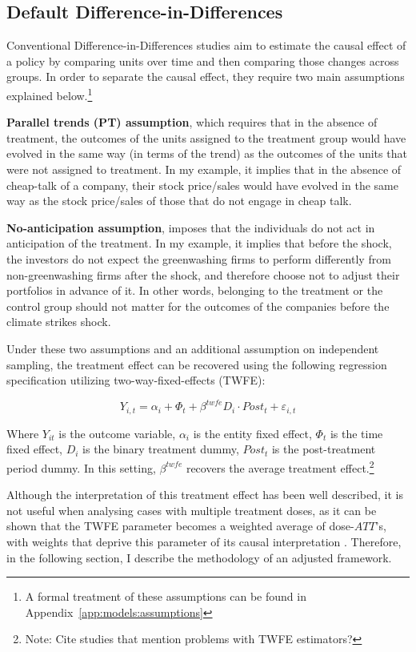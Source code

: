\documentclass[12pt]{article}
\begin{document}
\subsection{Default Difference-in-Differences}

Conventional Difference-in-Differences studies aim to estimate the causal effect of a policy by comparing units over time and then comparing those changes across groups. In order to separate the causal effect, they require two main assumptions explained below.\footnote{A formal treatment of these assumptions can be found in Appendix~\ref{app:models:assumptions}} 

\textbf{Parallel trends (PT) assumption}, which requires that in the absence of treatment, the outcomes of the units assigned to the treatment group would have evolved in the same way (in terms of the trend) as the outcomes of the units that were not assigned to treatment. In my example, it implies that in the absence of cheap-talk of a company, their stock price/sales would have evolved in the same way as the stock price/sales of those that do not engage in cheap talk. 

\textbf{No-anticipation assumption}, imposes that the individuals do not act in anticipation of the treatment. In my example, it implies that before the shock, the investors do not expect the greenwashing firms to perform differently from non-greenwashing firms after the shock, and therefore choose not to adjust their portfolios in advance of it. In other words, belonging to the treatment or the control group should not matter for the outcomes of the companies before the climate strikes shock.

Under these two assumptions and an additional assumption on independent sampling, the treatment effect can be recovered using the following regression specification utilizing two-way-fixed-effects (TWFE):

\begin{equation}
    Y_{i,t} = \alpha_i + \Phi_t + \beta^{twfe} D_{i} \cdot Post_{t} + \varepsilon_{i,t}
\end{equation}

Where $Y_{it}$ is the outcome variable, $\alpha_i$ is the entity fixed effect, $\Phi_t$ is the time fixed effect, $D_i$ is the binary treatment dummy, $Post_t$ is the post-treatment period dummy. In this setting, $\beta^{twfe}$ recovers the average treatment effect.\footnote{Note: Cite studies that mention problems with TWFE estimators?} 

Although the interpretation of this treatment effect has been well described, it is not useful when analysing cases with multiple treatment doses, as it can be shown that the TWFE parameter becomes a weighted average of dose-$ATT$'s, with weights that deprive this parameter of its causal interpretation \parencite{callawayDifferenceinDifferencesContinuousTreatment2025}. Therefore, in the following section, I describe the methodology of an adjusted framework.
\end{document}
